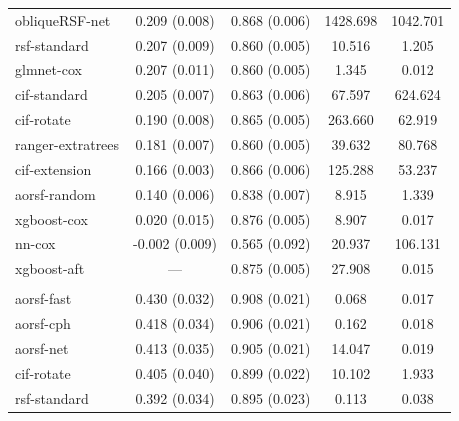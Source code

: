 \documentclass{article}\usepackage[]{graphicx}\usepackage[]{xcolor}
\newenvironment{knitrout}{}{} %
\begin{document}
\begin{knitrout}
\begin{longtable}[t]{lcccc}
\hspace{1em}obliqueRSF-net & 0.209 (0.008) & 0.868 (0.006) & 1428.698 & 1042.701\\
\hspace{1em}rsf-standard & 0.207 (0.009) & 0.860 (0.005) & 10.516 & 1.205\\
\hspace{1em}glmnet-cox & 0.207 (0.011) & 0.860 (0.005) & 1.345 & 0.012\\
\hspace{1em}cif-standard & 0.205 (0.007) & 0.863 (0.006) & 67.597 & 624.624\\
\hspace{1em}cif-rotate & 0.190 (0.008) & 0.865 (0.005) & 263.660 & 62.919\\
\hspace{1em}ranger-extratrees & 0.181 (0.007) & 0.860 (0.005) & 39.632 & 80.768\\
\hspace{1em}cif-extension & 0.166 (0.003) & 0.866 (0.006) & 125.288 & 53.237\\
\hspace{1em}aorsf-random & 0.140 (0.006) & 0.838 (0.007) & 8.915 & 1.339\\
\hspace{1em}xgboost-cox & 0.020 (0.015) & 0.876 (0.005) & 8.907 & 0.017\\
\hspace{1em}nn-cox & -0.002 (0.009) & 0.565 (0.092) & 20.937 & 106.131\\
\hspace{1em}xgboost-aft & --- & 0.875 (0.005) & 27.908 & 0.015\\
\addlinespace[0.3em]
\multicolumn{5}{l}{\textit{\textbf{Primary biliary cholangitis; death, n = 276, p = 19}}}\\
\hline
\hspace{1em}aorsf-fast & 0.430 (0.032) & 0.908 (0.021) & 0.068 & 0.017\\
\hspace{1em}aorsf-cph & 0.418 (0.034) & 0.906 (0.021) & 0.162 & 0.018\\
\hspace{1em}aorsf-net & 0.413 (0.035) & 0.905 (0.021) & 14.047 & 0.019\\
\hspace{1em}cif-rotate & 0.405 (0.040) & 0.899 (0.022) & 10.102 & 1.933\\
\hspace{1em}rsf-standard & 0.392 (0.034) & 0.895 (0.023) & 0.113 & 0.038\\

\end{longtable}
\end{knitrout}
\end{document}
